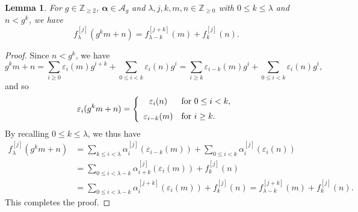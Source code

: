 \documentclass[hidelinks]{amsart}
\numberwithin{equation}{section}
\theoremstyle{plain}
\newtheorem{lemma}{Lemma}
\theoremstyle{definition}
\let\tmp\phi
\let\phi\varphi
\let\varphi\tmp
\let\tmp\epsilon
\let\epsilon\varepsilon
\let\varepsilon\tmp
\begin{document}
\begin{lemma}
\label{lem:wdf_additive}
For $g\in\mathbb{Z}_{\ge2}$, $\bm{\alpha}\in\mathscr{A}_{g}$
and $\lambda,j,k,m,n\in\mathbb{Z}_{\ge0}$ with $0\le k\le\lambda$ and $n<g^{k}$, we have
\[
f_{\lambda}^{[j]}(g^{k}m+n)
=
f_{\lambda-k}^{[j+k]}(m)+f_{k}^{[j]}(n).
\]
\end{lemma}
\begin{proof}
Since $n<g^{k}$, we have
\[
g^{k}m+n
=
\sum_{i\ge 0}\epsilon_{i}(m)g^{i+k}
+
\sum_{0\le i<k}\epsilon_{i}(n)g^{i}
=
\sum_{i\ge k}\epsilon_{i-k}(m)g^{i}
+
\sum_{0\le i<k}\epsilon_{i}(n)g^{i},
\]
and so
\[
\epsilon_{i}(g^{k}m+n)
=
\left\{
\begin{array}{>{\displaystyle}cl}
\epsilon_{i}(n)&\text{for $0\le i<k$},\\[2mm]
\epsilon_{i-k}(m)&\text{for $i\ge k$}.
\end{array}
\right.
\]
By recalling $0\le k\le\lambda$, we thus have
\begin{align}
f_{\lambda}^{[j]}(g^{k}m+n)
&=
\sum_{k\le i<\lambda}
\alpha_{i}^{[j]}(\epsilon_{i-k}(m))
+
\sum_{0\le i<k}
\alpha_{i}^{[j]}(\epsilon_{i}(n))\\
&=
\sum_{0\le i<\lambda-k}
\alpha_{i+k}^{[j]}(\epsilon_{i}(m))
+
f_{k}^{[j]}(n)\\
&=
\sum_{0\le i<\lambda-k}
\alpha_{i}^{[j+k]}(\epsilon_{i}(m))
+
f_{k}^{[j]}(n)
=
f_{\lambda-k}^{[j+k]}(m)
+
f_{k}^{[j]}(n).
\end{align}
This completes the proof.
\end{proof}
\end{document}
